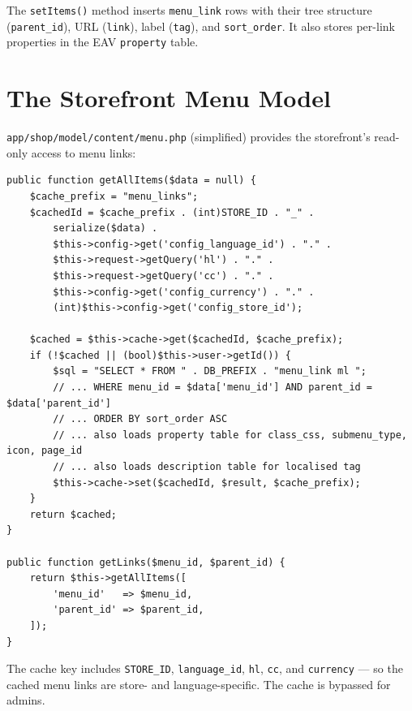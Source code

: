 \documentclass[11pt,a4paper]{article}
\begin{document}
The \texttt{setItems()} method inserts \texttt{menu\_link} rows with
their tree structure (\texttt{parent\_id}), URL (\texttt{link}), label
(\texttt{tag}), and \texttt{sort\_order}. It also stores per-link
properties in the EAV \texttt{property} table.

\section{The Storefront Menu Model}\label{sec:storefront-model}

\texttt{app/shop/model/content/menu.php} (simplified) provides the
storefront's read-only access to menu links:

\begin{lstlisting}[caption={Storefront \texttt{ModelContentMenu::getAllItems()} --- cached menu link retrieval.},label={lst:storefront-menu-model}]
public function getAllItems($data = null) {
    $cache_prefix = "menu_links";
    $cachedId = $cache_prefix . (int)STORE_ID . "_" .
        serialize($data) .
        $this->config->get('config_language_id') . "." .
        $this->request->getQuery('hl') . "." .
        $this->request->getQuery('cc') . "." .
        $this->config->get('config_currency') . "." .
        (int)$this->config->get('config_store_id');

    $cached = $this->cache->get($cachedId, $cache_prefix);
    if (!$cached || (bool)$this->user->getId()) {
        $sql = "SELECT * FROM " . DB_PREFIX . "menu_link ml ";
        // ... WHERE menu_id = $data['menu_id'] AND parent_id = $data['parent_id']
        // ... ORDER BY sort_order ASC
        // ... also loads property table for class_css, submenu_type, icon, page_id
        // ... also loads description table for localised tag
        $this->cache->set($cachedId, $result, $cache_prefix);
    }
    return $cached;
}

public function getLinks($menu_id, $parent_id) {
    return $this->getAllItems([
        'menu_id'   => $menu_id,
        'parent_id' => $parent_id,
    ]);
}
\end{lstlisting}

The cache key includes \texttt{STORE\_ID}, \texttt{language\_id},
\texttt{hl}, \texttt{cc}, and \texttt{currency} --- so the cached menu
links are store- and language-specific. The cache is bypassed for
admins.

\end{document}
